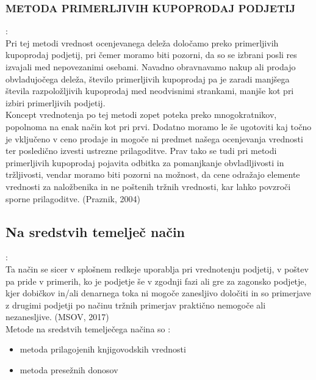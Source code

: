 \documentclass[12pt,a4paper]{amsart}
\theoremstyle{definition} %
\theoremstyle{plain} %
\begin{document}
\subsubsection{METODA PRIMERLJIVIH KUPOPRODAJ PODJETIJ}:\\
Pri tej metodi vrednost ocenjevanega deleža določamo preko primerljivih kupoprodaj podjetij, pri čemer moramo biti pozorni, da so se izbrani posli res izvajali med nepovezanimi osebami. Navadno obravnavamo nakup ali prodajo obvladujočega deleža, število primerljivih kupoprodaj pa je zaradi manjšega števila razpoložljivih kupoprodaj med neodvisnimi strankami, manjše kot pri izbiri primerljivih podjetij.\\
Koncept vrednotenja po tej metodi zopet poteka preko mnogokratnikov, popolnoma na enak način kot pri prvi. Dodatno moramo le še ugotoviti kaj točno je vključeno v ceno prodaje in mogoče ni predmet našega ocenjevanja vrednosti ter posledično izvesti ustrezne prilagoditve. Prav tako se tudi pri metodi primerljivih kupoprodaj pojavita odbitka za pomanjkanje obvladljivosti in tržljivosti, vendar moramo biti pozorni na možnost, da cene odražajo elemente vrednosti za naložbenika in ne poštenih tržnih vrednosti, kar lahko povzroči sporne prilagoditve. (Praznik, 2004)


\subsection{Na sredstvih temelječ način}:\\
Ta način se sicer v splošnem redkeje uporablja pri vrednotenju podjetij, v poštev pa pride v primerih, ko je podjetje še v zgodnji fazi ali gre za zagonsko podjetje, kjer dobičkov in/ali denarnega toka ni mogoče zanesljivo določiti in so primerjave z drugimi podjetji po načinu tržnih primerjav praktično nemogoče ali nezanesljive. (MSOV, 2017)\\
Metode na sredstvih temelječega načina so :
\begin{itemize}
\item metoda prilagojenih knjigovodskih vrednosti
\item metoda presežnih donosov
\end{itemize}
\end{document}
